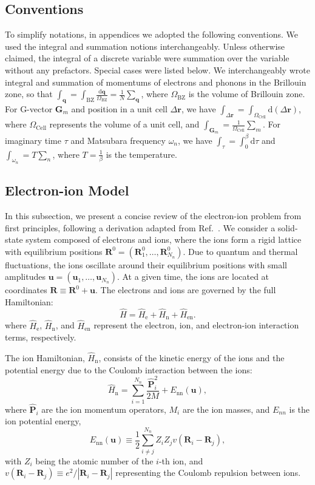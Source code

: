 \documentclass[%
 reprint,
superscriptaddress,
 amsmath,amssymb,
 aps,
prx,
]{revtex4-2}
\newcommand{\br}{\mathbf{r}}
\newcommand{\bR}{\mathbf{R}}
\newcommand{\bP}{\mathbf{P}}
\newcommand{\bq}{\mathbf{q}}
\newcommand{\bG}{\mathbf{G}}
\newcommand{\bu}{\mathbf{u}}
\newcommand{\txn}{\text{n}}
\newcommand{\txnn}{\text{nn}}
\begin{document}
\begin{appendices}
\subsection*{Conventions}
To simplify notations, in appendices we adopted the following conventions.
We used the integral and summation notions interchangeably. Unless otherwise claimed, the integral of a discrete variable were summation over the variable without any prefactors. 
Special cases were listed below.
We interchangeably wrote integral and summation of momentums of electrons and phonons in the Brillouin zone, 
so that $\int_{\bq}=\int_{\text{BZ}}\frac{\text{d}\bq}{\Omega_\text{BZ}}=\frac{1}{N}\sum_{\bq}$, 
where $\Omega_\text{BZ}$ is the volume of Brillouin zone.
For G-vector $\bG_m$ and position in a unit cell $\Delta\br$, we have $\int_{\Delta\br}=\int_{\Omega_\text{Cell}}{\text{d}(\Delta\br)}$, where $\Omega_\text{Cell}$ represents the volume of a unit cell, and $\int_{\bG_m}=\frac{1}{{\Omega_\text{Cell}}}\sum_{m}$.
For imaginary time $\tau$ and Matsubara frequency $\omega_n$, 
we have $\int_\tau=\int_{0}^{\beta}\text{d}\tau$ and $\int_{\omega_n}=T\sum_n$, 
where $T=\frac{1}{\beta}$ is the temperature.

\subsection{Electron-ion Model}

In this subsection, we present a concise review of the electron-ion problem from first principles, following a derivation adapted from Ref.~\cite{stefanucci_2023}. We consider a solid-state system composed of electrons and ions, where the ions form a rigid lattice with equilibrium positions $\bR^0=( \bR^0_1, \ldots, \bR^0_{N_n} )$. Due to quantum and thermal fluctuations, the ions oscillate around their equilibrium positions with small amplitudes $\bu=( \bu_1, \ldots, \bu_{N_n} )$. At a given time, the ions are located at coordinates $\bR \equiv \bR^0 + \bu$. The electrons and ions are governed by the full Hamiltonian:
\begin{equation}
  \hat{H} = \hat{H}_\text{e}+\hat{H}_\text{n}+\hat{H}_\text{en}.
\end{equation}
where $\hat{H}_\text{e}$, $\hat{H}_\text{n}$, and $\hat{H}_\text{en}$ represent the electron, ion, and electron-ion interaction terms, respectively.  

The ion Hamiltonian, $\hat{H}_\text{n}$, consists of the kinetic energy of the ions and the potential energy due to the Coulomb interaction between the ions:
\begin{equation}
  \hat{H}_\txn = \sum_{i=1}^{N_n}\frac{\hat{\bP}_i^2}{2M}+E_{\txnn}( \bu ),
\end{equation}
where $\hat{\bP}_i$ are the ion momentum operators, $M_i$ are the ion masses, and $E_{nn}$ is the ion potential energy, 
\begin{equation}
  E_{\txnn}( \bu ) \equiv \frac{1}{2}\sum_{i\neq j}^{N_n}Z_iZ_jv(\bR_i-\bR_j),
\end{equation} 
with $Z_i$ being the atomic number of the $i$-th ion, and $v(\bR_i-\bR_j) \equiv e^2/|\bR_i-\bR_j|$ representing the Coulomb repulsion between ions.


\end{appendices}
\end{document}
